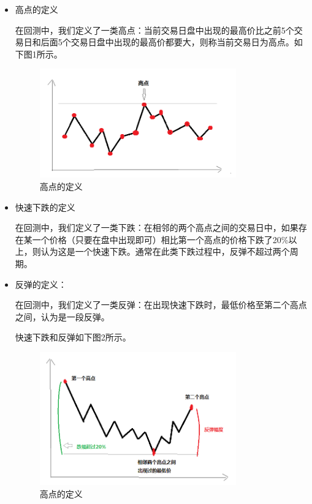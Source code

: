 \documentclass[12pt,a4paper]{article}
\begin{document}
\begin{itemize}
	\item 高点的定义
	
	在回测中，我们定义了一类高点：当前交易日盘中出现的最高价比之前5个交易日和后面5个交易日盘中出现的最高价都要大，则称当前交易日为高点。如下图1所示。
	
		\begin{figure}[H]
			\centering
			\includegraphics[width=0.8\textwidth]{img/2.png}%
			\caption{高点的定义}
		\end{figure}
	
	\item 快速下跌的定义
	
	在回测中，我们定义了一类下跌：在相邻的两个高点之间的交易日中，如果存在某一个价格（只要在盘中出现即可）相比第一个高点的价格下跌了20\%以上，则认为这是一个快速下跌。通常在此类下跌过程中，反弹不超过两个周期。
	\item 反弹的定义：
	
	在回测中，我们定义了一类反弹：在出现快速下跌时，最低价格至第二个高点之间，认为是一段反弹。
	
	快速下跌和反弹如下图2所示。
		\begin{figure}[H]
			\centering
			\includegraphics[width=0.8\textwidth]{img/3.png}%
			\caption{高点的定义}
		\end{figure}

\end{itemize}
\end{document}
